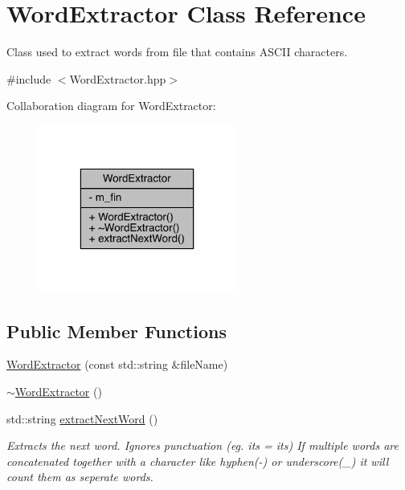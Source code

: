 \hypertarget{class_word_extractor}{}\section{Word\+Extractor Class Reference}
\label{class_word_extractor}


Class used to extract words from file that contains A\+S\+C\+II characters.  




{\ttfamily \#include $<$Word\+Extractor.\+hpp$>$}



Collaboration diagram for Word\+Extractor\+:
\nopagebreak
\begin{figure}[H]
\begin{center}
\leavevmode
\includegraphics[width=184pt]{class_word_extractor__coll__graph}
\end{center}
\end{figure}
\subsection*{Public Member Functions}
\begin{DoxyCompactItemize}
\item 
\mbox{\hyperlink{class_word_extractor_ad49ed8d220bc9cd36f3b0a285d52a081}{Word\+Extractor}} (const std\+::string \&file\+Name)
\item 
\mbox{\hyperlink{class_word_extractor_a20476de5cb146afd9bc318a629157a9c}{$\sim$\+Word\+Extractor}} ()
\item 
std\+::string \mbox{\hyperlink{class_word_extractor_aae86b87d65bcfe432ec50c88fec4f464}{extract\+Next\+Word}} ()
\begin{DoxyCompactList}\small\item\em Extracts the next word. Ignores punctuation (eg. it\textquotesingle{}s = its) If multiple words are concatenated together with a character like hyphen(-\/) or underscore(\+\_\+) it will count them as seperate words. \end{DoxyCompactList}\end{DoxyCompactItemize}

